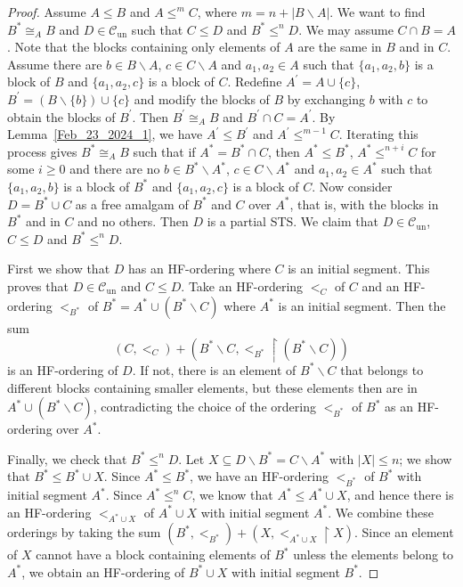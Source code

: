 \documentclass[10pt,a4paper]{article}
\newcommand{\Cun}{\mathcal{C}_\mathrm{un}}
\theoremstyle{note}
\begin{document}
	\begin{proof} Assume $A\leq B$  and  $A\leq^m C$, where $m= n+|B\smallsetminus A|$. We want to find $B^\ast\cong_A B$ and $D\in \Cun$  such that  $C\leq D$ and $B^\ast\leq^n D$.  We may assume $C\cap B=A$. Note that the blocks containing only elements of $A$ are the same in $B$ and in $C$.  Assume there are $b\in B\smallsetminus A$, $c\in C\smallsetminus A$ and  $a_1,a_2\in A$  such that $\{a_1,a_2,b\}$ is a block of $B$ and  $\{a_1,a_2,c\}$ is a block of $C$. Redefine $A^\prime= A\cup\{c\}$,  $B^\prime = (B\smallsetminus \{b\})\cup \{c\}$ and modify the blocks of $B$ by exchanging $b$ with $c$  to obtain the blocks of $B^\prime$. Then $B^\prime\cong_A B$ and $B^\prime\cap C=A^\prime$.  By Lemma~\ref{Feb_23_2024_1}, we have  $A^\prime\leq B^\prime$ and $A^\prime\leq^{m-1} C$. Iterating this process gives $B^\ast\cong_A B$  such that if $A^\ast =B^\ast \cap C$, then   $A^\ast \leq B^\ast$,  $A^\ast\leq^{n +i}C$  for some $i \geq 0$  and there are no $b\in B^\ast\smallsetminus A^\ast$, $c\in C\smallsetminus A^\ast$ and $a_1,a_2\in A^\ast$ such that  $\{a_1,a_2,b\}$ is a block of $B^\ast$  and  $\{a_1,a_2,c\}$ is a block of $C$.  Now consider $D=B^\ast\cup C$ as a free amalgam of $B^\ast$ and $C$ over $A^\ast$, that is,  with the blocks in $B^\ast$ and in $C$ and no others.  Then $D$ is a partial STS. We claim that $D\in \Cun$, $C\leq D$ and $B^\ast\leq^n D$.
		
First we show that $D$ has an HF-ordering where $C$ is an initial segment. This proves that $D\in\Cun$ and $C\leq D$.  Take an HF-ordering $<_C$ of $C$ and an HF-ordering $<_{B^\ast}$ of  $B^\ast=A^\ast\cup (B^\ast\smallsetminus C)$ where $A^\ast$ is an initial segment. Then the sum 
$$(C,<_C)+(B^\ast\smallsetminus C,<_{B^\ast}\restriction (B^\ast\smallsetminus C))$$ 
is an HF-ordering of $D$. If not, there is an element of $B^\ast\smallsetminus C$ that belongs to different blocks containing smaller elements, but these elements then are in $A^\ast\cup (B^\ast\smallsetminus C)$, contradicting the choice of the ordering $<_{B^\ast}$ of $B^\ast$ as an HF-ordering over $A^\ast$.
		
		Finally, we check that $B^\ast\leq^n D$.  Let $X\subseteq D\smallsetminus B^\ast = C\smallsetminus A^\ast$  with $|X|\leq n$; we show that $B^\ast\leq B^\ast \cup X$.  Since  $A^\ast\leq B^\ast$, we have an HF-ordering $<_{B^\ast}$ of $B^\ast$ with initial segment $A^\ast$.  Since $A^\ast\leq^n C$, we know that $A^\ast\leq A^\ast\cup X$, and hence there is an HF-ordering $<_{A^\ast \cup X}$ of $A^\ast\cup  X$ with initial segment $A^\ast$. We combine these orderings by taking the sum $(B^\ast,<_{B^\ast})+(X,<_{A^\ast\cup X}\restriction X)$. Since an element of $X$ cannot have a block containing elements of $B^\ast$ unless the elements belong to $A^\ast$, we obtain an HF-ordering of $B^\ast\cup X$ with initial segment $B^\ast$.
	\end{proof}
\end{document}
